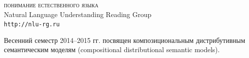 \documentclass[12pt]{article}
\begin{document}

\parindent 0mm


\begin{center}
{\rm \Huge \textsc{понимание естественного языка}}\\
\bigskip
{\rm \Large Natural Language Understanding Reading Group}\\
\bigskip
{\rm \Large \texttt{http://nlu-rg.ru}}
\end{center}

\bigskip
\medskip

\begin{spacing}{1.2}
\hfill
\parbox{0.986\textwidth}{
Весенний семестр 2014--2015 гг. посвящен композициональным дистрибутивным семантическим моделям (compositional distributional semantic models).
}
\end{spacing}

\medskip
\end{document}
